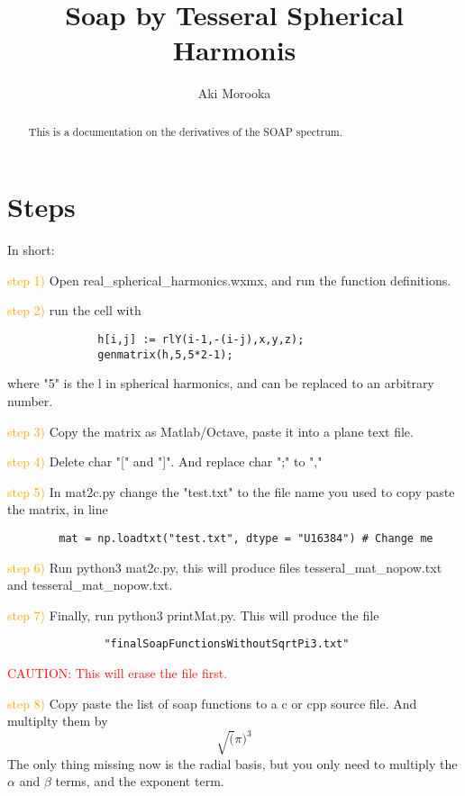 \documentclass{article}
\begin{document}
\title{Soap by Tesseral Spherical Harmonis}
\author{Aki Morooka}

\maketitle

\begin{abstract}
This is a documentation on the derivatives of the SOAP spectrum.
\end{abstract}

\section*{Steps}
In short: 

\textcolor{orange}{step 1)} Open real\_spherical\_harmonics.wxmx, and run the function definitions.

\textcolor{orange}{step 2)} run the cell with
\begin{verbatim}
              h[i,j] := rlY(i-1,-(i-j),x,y,z);
              genmatrix(h,5,5*2-1);
\end{verbatim}

where "5" is the l in spherical harmonics, and can be replaced to an arbitrary number.

\textcolor{orange}{step 3)} Copy the matrix as Matlab/Octave, paste it into a plane text file.

\textcolor{orange}{step 4)} Delete char "[" and "]". And replace char ";" to ","

\textcolor{orange}{step 5)} In mat2c.py change the "test.txt" to the file name you used to copy paste the matrix, in line

\begin{verbatim}
        mat = np.loadtxt("test.txt", dtype = "U16384") # Change me
\end{verbatim}

\textcolor{orange}{step 6)} Run python3 mat2c.py, this will produce files tesseral\_mat\_nopow.txt and tesseral\_mat\_nopow.txt.

\textcolor{orange}{step 7)} Finally, run  python3 printMat.py. This will produce the file
\begin{verbatim}
               "finalSoapFunctionsWithoutSqrtPi3.txt"
\end{verbatim}

\textcolor{red} {CAUTION: This will erase the file first.}

\textcolor{orange}{step 8)} Copy paste the list of soap functions to a c or cpp source file. And multiplty them by
\begin{equation}
     \sqrt(\pi)^3
\end{equation}
The only thing missing now is the radial basis, but you only need to multiply the $\alpha$ and $\beta$ terms, and the exponent term.
\end{document}
